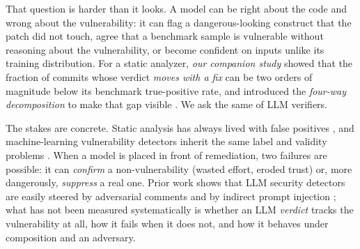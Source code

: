 \documentclass[conference]{IEEEtran}
\begin{document}
That question is harder than it looks. A model can be right about the code and
wrong about the vulnerability: it can flag a dangerous-looking construct that the
patch did not touch, agree that a benchmark sample is vulnerable without reasoning
about the vulnerability, or become confident on inputs unlike its training
distribution. For a static analyzer, \emph{our companion study} showed
that the fraction of commits whose verdict \emph{moves with a fix} can be two
orders of magnitude below its benchmark true-positive rate, and introduced the
\emph{four-way decomposition} to make that gap visible \cite{sastaudit}. We ask the
same of LLM verifiers.

The stakes are concrete. Static analysis has always lived with false positives
\cite{sadowski2018lessons}, and machine-learning vulnerability detectors inherit the
same label and validity problems \cite{chakraborty2022deep,croft2023data,
arp2022dos}. When a model is placed in front of remediation, two failures are
possible: it can \emph{confirm} a non-vulnerability (wasted effort, eroded trust)
or, more dangerously, \emph{suppress} a real one. Prior work shows that LLM
security detectors are easily steered by adversarial comments \cite{alibi} and by
indirect prompt injection \cite{greshake2023not}; what has not been measured
systematically is whether an LLM \emph{verdict} tracks the vulnerability at all, how
it fails when it does not, and how it behaves under composition and an adversary.
\end{document}
